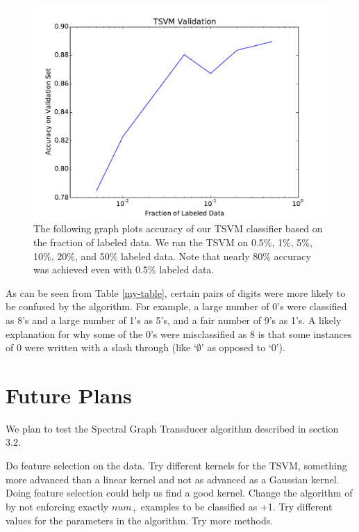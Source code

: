 \documentclass[11pt]{article}
\begin{document}
\begin{figure}
  \centering
  \caption{The following graph plots accuracy of our TSVM classifier based on the fraction of labeled data. We ran the TSVM on 0.5\%, 1\%, 5\%, 10\%, 20\%, and 50\% labeled data. Note that nearly 80\% accuracy was achieved even with 0.5\% labeled data.}
  \includegraphics[width=5in]{tsvm.pdf}
\end{figure}


As can be seen from Table \ref{my-table}, certain pairs of digits were more likely to be confused by the algorithm. For example, a large number of 0's were classified as 8's and a large number of 1's as 5's, and a fair number of 9's as 1's. A likely explanation for why
some of the 0's were misclassified as 8 is that some instances of 0 were written with a slash through (like `$\emptyset$' as opposed to `0').

\section{Future Plans}

We plan to test the Spectral Graph Transducer algorithm described in
section 3.2.

Do feature selection on the data. 
Try different kernels for the TSVM, something more advanced than a linear kernel and not as advanced as a Gaussian kernel. Doing feature selection could help us find a good kernel. Change the algorithm of \cite{Joachims:1999} by not enforcing exactly $num_+$ examples to be classified as +1. Try different values for the parameters in the algorithm.
Try more methods.
\end{document}
